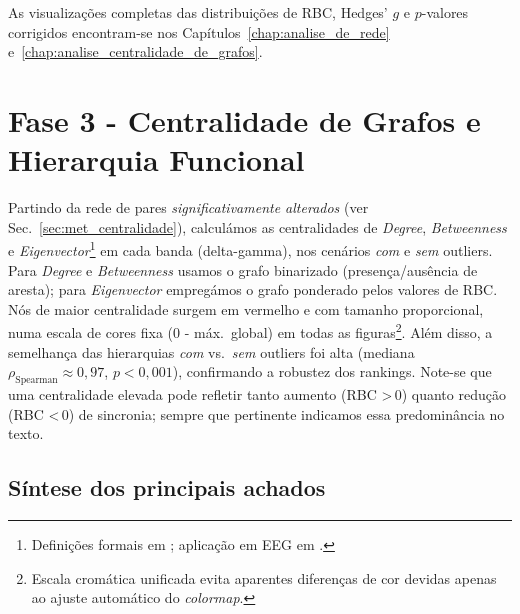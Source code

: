 As visualizações completas das distribuições de RBC, Hedges' $g$ e $p$-valores corrigidos encontram-se nos Capítulos~\ref{chap:analise_de_rede} e~\ref{chap:analise_centralidade_de_grafos}.

\section{Fase 3 - Centralidade de Grafos e Hierarquia Funcional}
\label{sec:fase3_centralidade}

Partindo da rede de pares \emph{significativamente alterados} (ver Sec.~\ref{sec:met_centralidade}), calculámos as centralidades de \textit{Degree}, \textit{Betweenness} e \textit{Eigenvector}\footnote{Definições formais em \cite{rubinov2010complex,bullmore2009complex}; aplicação em EEG em .} em cada banda (delta-gamma), nos cenários \emph{com} e \emph{sem} outliers. Para \textit{Degree} e \textit{Betweenness} usamos o grafo binarizado (presença/ausência de aresta); para \textit{Eigenvector} empregámos o grafo ponderado pelos valores de RBC. Nós de maior centralidade surgem em vermelho e com tamanho proporcional, numa escala de cores fixa (0 - máx.\ global) em todas as figuras\footnote{Escala cromática unificada evita aparentes diferenças de cor devidas apenas ao ajuste automático do \textit{colormap}.}.  
Além disso, a semelhança das hierarquias \emph{com} vs.\ \emph{sem} outliers foi alta (mediana $\rho_{\text{Spearman}}\approx0{,}97$, $p<0{,}001$), confirmando a robustez dos rankings.  
Note-se que uma centralidade elevada pode refletir tanto aumento (RBC >\,0) quanto redução (RBC <\,0) de sincronia; sempre que pertinente indicamos essa predominância no texto.


\subsection*{Síntese dos principais achados}

